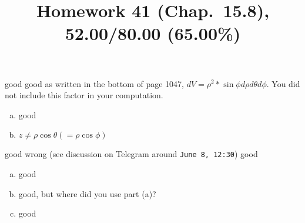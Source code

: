 \documentclass[pstricks,10pt,dvipsnames]{article} %
\title{Homework 41 (Chap.~15.8),
52.00/80.00 (65.00\%)
}
\begin{document}
\maketitle
{}
good
good
as written in the bottom of page 1047, $dV=\rho^2*\sin\phi d\rho d\theta d\phi$. You did
not include this factor in your computation.
\begin{enumerate}[(a)]
	\item good
	\item $z\neq\rho\cos\theta(= \rho\cos\phi)$
\end{enumerate}
good
wrong (see discussion on Telegram around \texttt{June 8, 12:30})
good
\begin{enumerate}[(a)]
	\item good
	\item good, but where did you use part (a)?
	\item good
\end{enumerate}
\end{document}
